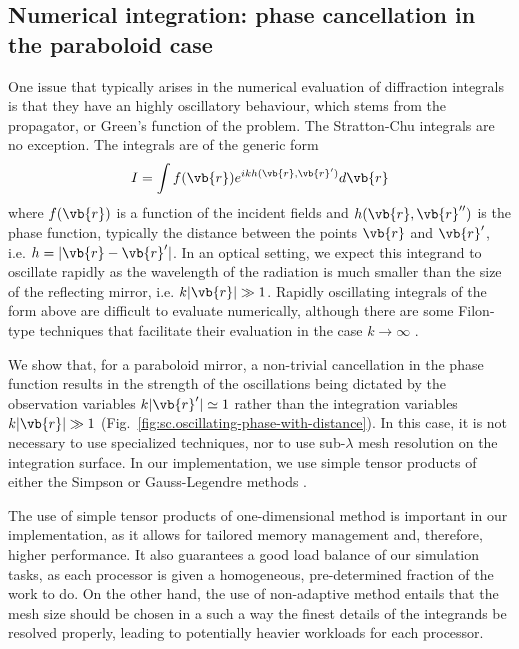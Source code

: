 \documentclass[11pt,SymmetricalJury]{inrsthesis/inrsthesis}
\begin{document}
\subsection{Numerical integration: phase cancellation in the paraboloid case}
\label{sec:sc.phase-cancellation}

One issue that typically arises in the numerical evaluation of diffraction
integrals is that they have an highly oscillatory behaviour, which stems from
the propagator, or Green's function of the problem. The Stratton-Chu integrals
are no exception. The integrals are of the generic form
  \begin{equation}
    I = \int f(\vb{r})e^{ikh(\vb{r},\vb{r}')}d\vb{r}
  \end{equation}
where $f(\vb{r})$ is a function of the incident fields and $h(\vb{r},\vb{r}'')$
is the phase function, typically the distance between the points $\vb{r}$ and
$\vb{r}'$, i.e. $h=|\vb{r}-\vb{r}'|$. In an optical setting, we expect this
integrand to oscillate rapidly as the wavelength of the radiation is much
smaller than the size of the reflecting mirror, i.e. $k|\vb{r}|\gg1$. Rapidly
oscillating integrals of the form above are difficult to evaluate numerically,
although there are some Filon-type techniques that facilitate their evaluation
in the case $k\rightarrow\infty$ \cite{Iserles2004,Ganesh2007}.

We show that, for a paraboloid mirror, a non-trivial cancellation in the phase
function results in the strength of the oscillations being dictated by the
observation variables $k|\vb{r}'|\simeq1$ rather than the integration variables
$k|\vb{r}|\gg1$ (Fig.~\ref{fig:sc.oscillating-phase-with-distance}). In this
case, it is not necessary to use specialized techniques, nor to use
sub-$\lambda$ mesh resolution on the integration surface. In our implementation,
we use simple tensor products of either the Simpson or Gauss-Legendre methods
\cite[\S4.6]{Press1986}.

The use of simple tensor products of one-dimensional method is important in our
implementation, as it allows for tailored memory management and, therefore,
higher performance. It also guarantees a good load balance of our simulation
tasks, as each processor is given a homogeneous, pre-determined fraction of the
work to do. On the other hand, the use of non-adaptive method entails that the
mesh size should be chosen in a such a way the finest details of the integrands
be resolved properly, leading to potentially heavier workloads for each
processor.
\end{document}

